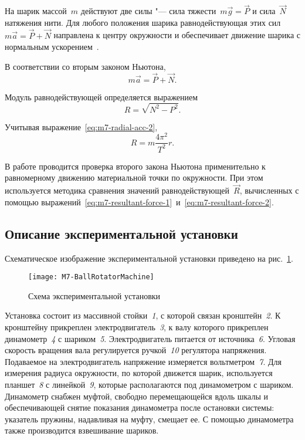 \documentclass[a4paper, 12pt]{extarticle}
\begin{document}
На шарик массой~$m$ действуют две силы "--- сила тяжести~$m\vec{g} = \vec{P}$ и сила~$\vec{N}$ натяжения нити. Для любого положения шарика равнодействующая этих сил~$m\vec{a} = \vec{P} + \vec{N}$ направлена к центру окружности и обеспечивает движение шарика с нормальным ускорением~.

В соответствии со вторым законом Ньютона, %
\begin{equation}
\label{eq:m7-2nd-newton's-law}
m\vec{a} = \vec{P} + \vec{N}.
\end{equation}

Модуль равнодействующей определяется выражением
\begin{equation}
\label{eq:m7-resultant-force-1}
R = \sqrt{N^2 - P^2}.
\end{equation}

Учитывая выражение~\eqref{eq:m7-radial-acc-2},
\begin{equation}
\label{eq:m7-resultant-force-2}
R = m\frac{4\pi^2}{T^2}r.
\end{equation}

В работе проводится проверка второго закона Ньютона применительно к равномерному движению материальной точки по окружности. При этом используется методика сравнения значений равнодействующей~$\vec{R}$, вычисленных с помощью выражений~\eqref{eq:m7-resultant-force-1}~и~\eqref{eq:m7-resultant-force-2}.

\subsection{Описание экспериментальной установки}
Схематическое изображение  экспериментальной установки приведено на рис.~\ref{fig:m7-equipment}.

\begin{figure}[h] %
\begin{center}
\texttt{[image: M7-BallRotatorMachine]}
\end{center}
\caption{Схема экспериментальной установки \label{fig:m7-equipment}}
\end{figure}

Установка состоит из массивной стойки~\emph{1}, с которой связан кронштейн~\emph{2}. К кронштейну прикреплен электродвигатель~\emph{3}, к валу которого прикреплен динамометр~\emph{4} с шариком~\emph{5}. Электродвигатель питается от источника~\emph{6}. Угловая скорость вращения вала регулируется ручкой~\emph{10} регулятора напряжения. Подаваемое на электродвигатель напряжение измеряется вольтметром~\emph{7}. Для измерения радиуса окружности, по которой движется шарик, используется планшет~\emph{8} с линейкой~\emph{9}, которые располагаются под динамометром с шариком. Динамометр снабжен муфтой, свободно перемещающейся  вдоль шкалы и обеспечивающей снятие показания динамометра после остановки системы: указатель пружины, надавливая на муфту, смещает ее. С помощью динамометра также производится взвешивание шариков. 
\end{document}
